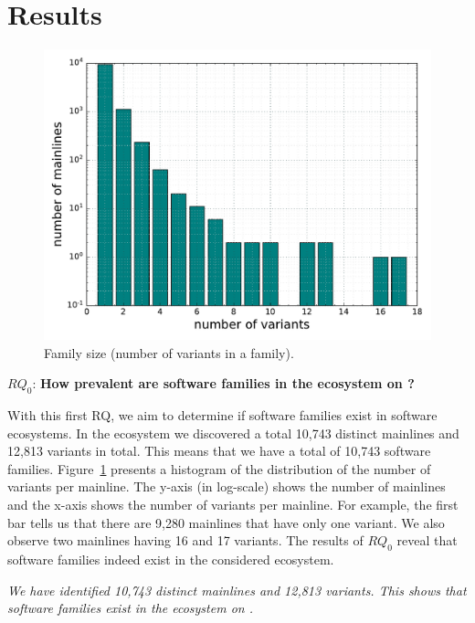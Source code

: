 \section{Results}
\label{sec:results}
\begin{figure}[htbp]
\vspace{-.3cm}
   \centering
    \includegraphics[scale=0.3]{figures/variants.pdf}
    \caption{Family size (number of variants in a family).}
   
    \label{fig:variants}
\end{figure}

\noindent
$RQ_0$: \textbf{How prevalent are software families in the \js ecosystem on \gh?}

With this first RQ, we aim to determine if software families exist in software ecosystems. In the \js ecosystem we discovered a total 10,743 distinct mainlines and 12,813 variants in total. This means that we have a total of 10,743 software families. Figure~\ref{fig:variants} presents a histogram of the distribution of the number of variants per mainline. The y-axis (in log-scale) shows the number of mainlines and  the x-axis shows the number of variants per mainline. For example, the first bar tells us that there are 9,280 mainlines that have only one variant. We also observe two mainlines having 16 and 17 variants. The results of $RQ_0$ reveal that software families indeed exist in the considered ecosystem.%

\begin{framed}
\noindent
\emph{We have identified 10,743 distinct mainlines and 12,813 variants. This shows that software families exist in the \js ecosystem on \gh.}
\end{framed}

